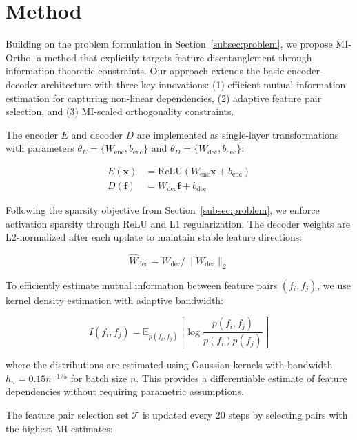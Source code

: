 \documentclass{article} %
\begin{document}
\section{Method}
\label{sec:method}

Building on the problem formulation in Section~\ref{subsec:problem}, we propose MI-Ortho, a method that explicitly targets feature disentanglement through information-theoretic constraints. Our approach extends the basic encoder-decoder architecture with three key innovations: (1) efficient mutual information estimation for capturing non-linear dependencies, (2) adaptive feature pair selection, and (3) MI-scaled orthogonality constraints.

The encoder $E$ and decoder $D$ are implemented as single-layer transformations with parameters $\theta_E = \{W_{\text{enc}}, b_{\text{enc}}\}$ and $\theta_D = \{W_{\text{dec}}, b_{\text{dec}}\}$:

\begin{align}
    E(\mathbf{x}) &= \text{ReLU}(W_{\text{enc}}\mathbf{x} + b_{\text{enc}}) \\
    D(\mathbf{f}) &= W_{\text{dec}}\mathbf{f} + b_{\text{dec}}
\end{align}

Following the sparsity objective from Section~\ref{subsec:problem}, we enforce activation sparsity through ReLU and L1 regularization. The decoder weights are L2-normalized after each update to maintain stable feature directions:

\begin{equation}
    \hat{W}_{\text{dec}} = W_{\text{dec}} / \|W_{\text{dec}}\|_2
\end{equation}

To efficiently estimate mutual information between feature pairs $(f_i, f_j)$, we use kernel density estimation with adaptive bandwidth:

\begin{equation}
    I(f_i, f_j) = \mathbb{E}_{p(f_i, f_j)}\left[\log \frac{p(f_i, f_j)}{p(f_i)p(f_j)}\right]
\end{equation}

where the distributions are estimated using Gaussian kernels with bandwidth $h_n = 0.15n^{-1/5}$ for batch size $n$. This provides a differentiable estimate of feature dependencies without requiring parametric assumptions.

The feature pair selection set $\mathcal{T}$ is updated every 20 steps by selecting pairs with the highest MI estimates:
\end{document}
